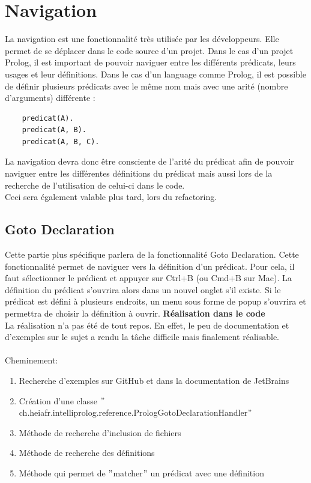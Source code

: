 \section{Navigation}
\noindent La navigation est une fonctionnalité très utilisée par les développeurs.
Elle permet de se déplacer dans le code source d'un projet.
Dans le cas d'un projet Prolog, il est important de pouvoir naviguer entre les différents prédicats, leurs usages et leur définitions.
\newdoubleline
Dans le cas d'un language comme Prolog, il est possible de définir plusieurs prédicats avec le même nom mais avec une arité (nombre d'arguments) différente :

\begin{lstlisting}
    predicat(A).
    predicat(A, B).
    predicat(A, B, C).
\end{lstlisting}

La navigation devra donc être consciente de l'arité du prédicat afin de pouvoir naviguer entre les différentes définitions du prédicat mais aussi lors de la recherche de l'utilisation de celui-ci dans le code.
\\ Ceci sera également valable plus tard, lors du refactoring.

\subsection{Goto Declaration}
\noindent Cette partie plus spécifique parlera de la fonctionnalité Goto Declaration.
Cette fonctionnalité permet de naviguer vers la définition d'un prédicat.
Pour cela, il faut sélectionner le prédicat et appuyer sur Ctrl+B (ou Cmd+B sur Mac).
La définition du prédicat s'ouvrira alors dans un nouvel onglet s'il existe.
Si le prédicat est défini à plusieurs endroits, un menu sous forme de popup s'ouvrira et permettra de choisir la définition à ouvrir.
\newdoubleline
\noindent \textbf{Réalisation dans le code}
\\
\noindent La réalisation n'a pas été de tout repos.
En effet, le peu de documentation et d'exemples sur le sujet a rendu la tâche difficile mais finalement réalisable.
\\
\\

\noindent Cheminement:
\begin{enumerate}
    \item Recherche d'exemples sur GitHub et dans la documentation de JetBrains
    \item Création d'une classe \("\)ch.heiafr.intelliprolog.reference.PrologGotoDeclarationHandler\("\)
    \item Méthode de recherche d'inclusion de fichiers
    \item Méthode de recherche des définitions
    \item Méthode qui permet de \("\)matcher\("\) un prédicat avec une définition
\end{enumerate}

